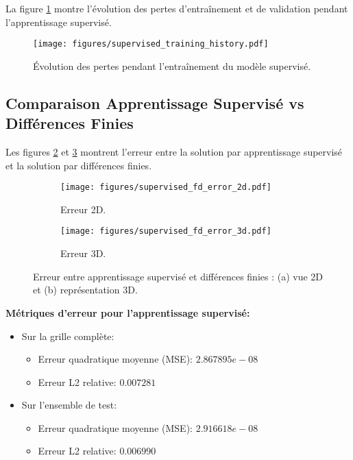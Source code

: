 \documentclass[11pt,a4paper]{article}
\begin{document}
La figure \ref{fig:sup_training} montre l'évolution des pertes d'entraînement et de validation pendant l'apprentissage supervisé.

\begin{figure}[H]
    \centering
    \texttt{[image: figures/supervised\_training\_history.pdf]}
    \caption{Évolution des pertes pendant l'entraînement du modèle supervisé.}
    \label{fig:sup_training}
\end{figure}

\subsection{Comparaison Apprentissage Supervisé vs Différences Finies}

Les figures \ref{fig:sup_error_2d} et \ref{fig:sup_error_3d} montrent l'erreur entre la solution par apprentissage supervisé et la solution par différences finies.

\begin{figure}[H]
    \centering
    \begin{subfigure}{0.45\textwidth}
        \centering
        \texttt{[image: figures/supervised\_fd\_error\_2d.pdf]}
        \caption{Erreur 2D.}
        \label{fig:sup_error_2d}
    \end{subfigure}
    \hfill
    \begin{subfigure}{0.45\textwidth}
        \centering
        \texttt{[image: figures/supervised\_fd\_error\_3d.pdf]}
        \caption{Erreur 3D.}
        \label{fig:sup_error_3d}
    \end{subfigure}
    \caption{Erreur entre apprentissage supervisé et différences finies : (a) vue 2D et (b) représentation 3D.}
    \label{fig:sup_errors}
\end{figure}

\textbf{Métriques d'erreur pour l'apprentissage supervisé:}
\begin{itemize}
    \item Sur la grille complète:
    \begin{itemize}
        \item Erreur quadratique moyenne (MSE): $2.867895e-08$
        \item Erreur L2 relative: $0.007281$
    \end{itemize}
    \item Sur l'ensemble de test:
    \begin{itemize}
        \item Erreur quadratique moyenne (MSE): $2.916618e-08$
        \item Erreur L2 relative: $0.006990$
    \end{itemize}
\end{itemize}
\end{document}
